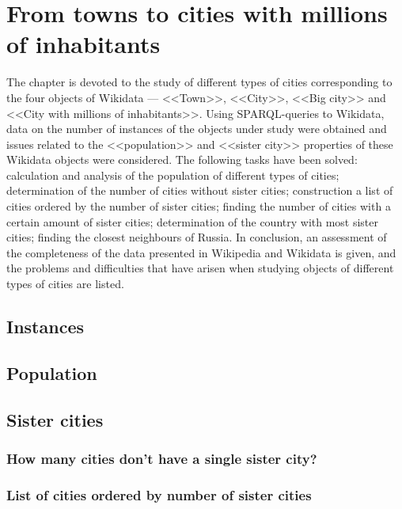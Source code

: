 \setchapterpreamble[u]{\margintoc}
\chapter{From towns to cities with millions of inhabitants}

The chapter is devoted to the study of different types of cities corresponding to the four objects of Wikidata — <<Town>>, <<City>>, <<Big city>> and <<City with millions of inhabitants>>. Using SPARQL-queries to Wikidata, data on the number of instances of the objects under study were obtained and issues related to the <<population>> and <<sister city>> properties of these Wikidata objects were considered. The following tasks have been solved: calculation and analysis of the population of different types of cities; determination of the number of cities without sister cities; construction a list of cities ordered by the number of sister cities; finding the number of cities with a certain amount of sister cities; determination of the country with most sister cities; finding the closest neighbours of Russia. In conclusion, an assessment of the completeness of the data presented in Wikipedia and Wikidata is given, and the problems and difficulties that have arisen when studying objects of different types of cities are listed.

\section{Instances}

\section{Population}

\section{Sister cities}

\subsection{How many cities don't have a single sister city?}
\subsection{List of cities ordered by number of sister cities}
